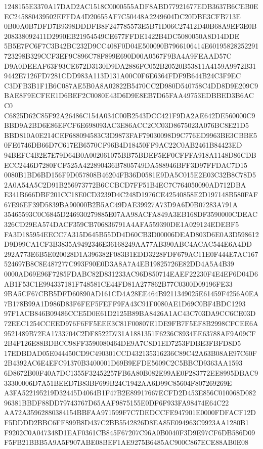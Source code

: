 \documentclass[UTF8,fontset=fandol,zihao=-4,a4paper]{ctexart}
\begin{document}
{{1248155E3370A17DAD2AC1518C0000555ADF8ABD77921677EDB3637B6CEB0EEC245880439502EFFDA4D20655AF7C50448A2249604DC20DBE3CFB713E
0B00A0B7DFD7B9398DDDFB8F247785573E5B71D06C27412D40B68A9EF3E0B208338092411D2990EB21954549CE677FFDE1422B4DC5080050A8D14DDE
5B5E7FC6F7C3B42BC232D9CC408F0D04E500090B7966106414E60195828252291723298B329CCF3EF9C896C78F899E690D00A0567F9BA4A9FEAAD57C
D9A0DEEAF63F93CE672D3130D9DA2886FC052B20520B53811A4159A9972B319442E7126FD7281CDD983A113D131A00C0F6E6364FDF9B644B24C3F9EC
C3DFB3B1F1B6C087AE5B0A8A02822B5470CC2D980D540758C4DD8D9E209C9BAE8F9ECFEE1D6BEF2C0080E43D6D9E8EB7D65FAA49753EDBBED3B6ACC0
C6825D62C85F92A26486C154A034C00B2543DCC421F9DA2AE642DE560000C9BBD9A2BD6E86EFCF6E698093AC3E86ACC2CC03D8675023A076BC8E21D5
BBD810A0E214CEF688094583C3D9873FAF79030098D9C776ED9963BE3CBBE50FE6746DB66D7C617EB6570CF96B4D18450FF9AC22C0AB2461B84423ED
94BEFC4B2E7E79D64B0A002061075BB75BDEF5EF0CFFFA918A1148D86CDBECC2446D7280FCF525A422890436B7805749DA588946BFF3D97FFDAC7D15
0080B1BD6BD156F9D057808B46204FB36D0581E9DA5C015E2E03C32B8C78D52A0A54A5C2D91B256973772B6CCBCD7FF51B4EC7C764050090AD712DBA
E341B666DBF201CC18E0CD3239D4C248D1976CE42540858E2D197148B580FAF67E96EF39D5839BA90000B2B5AC49DAE39927A73D9A6D0B07283A791A
35465593C0C6845D246930279885E07AA98ACFA849A3EB168DF3590000CDEAC326CD29EA574DACF359CB706836791A4AFA559390DE1A029124EDEBF5
FA3D185954EECC7A315D645B55DD4D60CB3D00006DEAD803D6E0A3D598612D9D99CA1CF3B3835A9492346E36168249AA77AB390ABC4ACAC544E6A4DD
292A773E6B5E020028D1A396382F083B1EDD3228FDF679AC11E0F444E7AC167524697B8C8E487277C993F90E0D3A8A7A4EB19825726E82DD4A5A4B39
0000AD69E96F7285FDABC82D831233AC96D850714EAEF22230F4E4EF6D04D6AB1F53C1E994337181F748581CE44FD81A277862B77C0300D09196FE33
9BA5CF67CBB5DFD60890AD161CD4A28EE464B9211349025E61459F4256A0EA7B178B99A1D986D83F6FEF5FEFF9FA43C91F0080AE1D69C0BF4BDC1293
97F1ACB846B09486CCE5D0E61D2125B89BA8426A1AC43C703DA9CC6CE03D72EEC1254CCEED976F6FF5EEE3C81F00807E1DE9FB7F5EF8B2998CFCEE6A
9521489B72EA1733704C2DF8522D731A1881351F6236C8934EE63788AF9A09CF2B4F126E88BDBCC98FF3590080464DE9A7C8D1ED7253FDBE3FBFD8D5
17EDBDAD05E044450CD9C490301CCD432135316236C89C42A63B08AE97C60F2B4392AC6E4EFC91370B3400001D69B9EFDE5609C2C5BBCD9363AA1593
6D8672B00F40A7DC1355F32452257FB6A80B082E99AE0F283772EE8995DBAC933300006D7A51BEED7B83BF699B24C1942AA6D99C85604F807269269E
A3FA522195219D32445D4064B1F47B2E89917667ECFD2D453E856C010068D08296381BBDF88DD79743767D65AAF9875155E0DF6F933FA98474E64C22
AA72A35962880384154BBFAA971599F7C7DEDCCFE947901E0000FDFACF12DF5DDDD2BBC6FF899B8D437C2BB5542826D8EA85E094963C9923AA1280B1
F9202C0A047348D1EAF0361CB845F67207C96A0B0040F3D9E97CF6DB586D09F5FB21BBB5A9A5F907ABE08BEF1AE9275B6485AC900C867ECE88AB0E08
}}
\end{document}
